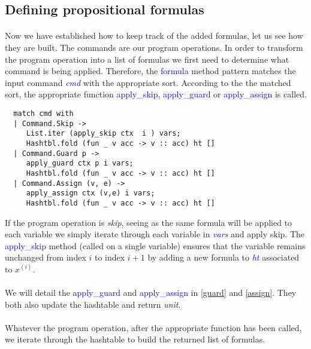 \documentclass[letterpaper,12pt]{article}
\begin{document}
\subsection{Defining propositional formulas}
\paragraph{}
Now we have established how to keep track of the added formulas, let us see how they are built.
The commands are our program operations. In order to transform the program operation into a list of formulas we first need to determine what command is being applied.
Therefore, the \textcolor{blue}{formula} method pattern matches the input command \textit{\textcolor{blue}{cmd}} with the appropriate sort. According to the the matched sort, the appropriate function \textcolor{blue}{apply\_skip}, \textcolor{blue}{apply\_guard} or \textcolor{blue}{apply\_assign} is called. 

\begin{verbatim}
  match cmd with
  | Command.Skip ->
     List.iter (apply_skip ctx  i ) vars;
     Hashtbl.fold (fun _ v acc -> v :: acc) ht []
  | Command.Guard p ->
     apply_guard ctx p i vars;
     Hashtbl.fold (fun _ v acc -> v :: acc) ht []
  | Command.Assign (v, e) ->
     apply_assign ctx (v,e) i vars;
     Hashtbl.fold (fun _ v acc -> v :: acc) ht []
\end{verbatim}

If the program operation is \textit{skip}, seeing as the same formula will be applied to each variable we simply iterate through each variable in \textit{\textcolor{blue}{vars}} and apply skip. The \textcolor{blue}{apply\_skip} method (called on a single variable) ensures that the variable remains unchanged from index $i$ to index $i+1$ by adding a new formula to \textit{\textcolor{blue}{ht}} associated to $x^{(i)}$.

\paragraph{}
We will detail the \textcolor{blue}{apply\_guard} and \textcolor{blue}{apply\_assign} in \ref{guard} and \ref{assign}.
They both also update the hashtable and return \textit{unit}.
\paragraph{}
Whatever the program operation, after the appropriate function has been called, we iterate through the hashtable to build the returned list of formulas.
\end{document}
